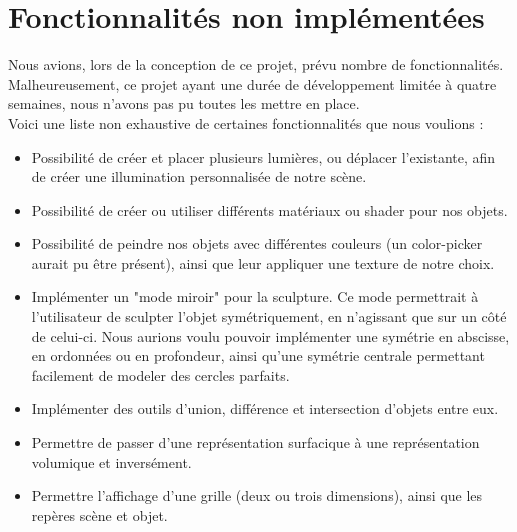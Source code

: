 \documentclass[a4paper]{memoir}
\begin{document}
		\section{Fonctionnalités non implémentées}
			Nous avions, lors de la conception de ce projet, prévu nombre de fonctionnalités. Malheureusement, ce projet ayant une durée de 
			développement limitée à quatre semaines, nous n'avons pas pu toutes les mettre en place.\\
			Voici une liste non exhaustive de certaines fonctionnalités que nous voulions :
			\begin{itemize}
				\item Possibilité de créer et placer plusieurs lumières, ou déplacer l'existante, afin de créer une illumination personnalisée de notre 
				scène.
				\item Possibilité de créer ou utiliser différents matériaux ou shader pour nos objets.
				\item Possibilité de peindre nos objets avec différentes couleurs (un color-picker aurait pu être présent), ainsi que leur appliquer 
				une texture de notre choix.
				\item Implémenter un "mode miroir" pour la sculpture. Ce mode permettrait à l'utilisateur de sculpter l'objet symétriquement, en 
				n'agissant que sur un côté de celui-ci. Nous aurions voulu pouvoir implémenter une symétrie en abscisse, en ordonnées ou en profondeur, 
				ainsi qu'une symétrie centrale permettant facilement de modeler des cercles parfaits.
				\item Implémenter des outils d'union, différence et intersection d'objets entre eux.
				\item Permettre de passer d'une représentation surfacique à une représentation volumique et inversément.
				\item Permettre l'affichage d'une grille (deux ou trois dimensions), ainsi que les repères scène et objet.
			\end{itemize}
			
\end{document}
